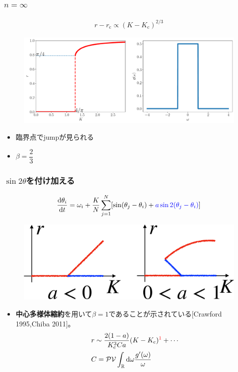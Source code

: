 \begin{frame}\frametitle{$n=\infty$}
  \begin{align*}
    r-r_{\mathrm{c}}\propto(K-K_{\mathrm{c}})^{2/3}
  \end{align*}
  \begin{figure}
    \begin{center}
      \includegraphics[scale=0.3]{figs/bif-n-inf.pdf}
    \end{center}
  \end{figure}
  \begin{itemize}
    \item 臨界点でjumpが見られる
    \item $\beta=\dfrac{2}{3}$
  \end{itemize}
\end{frame}

\begin{frame}\frametitle{$\sin2\theta$を付け加える}
  \begin{align*}
    \frac{\mathrm{d}\theta_{i}}{\mathrm{d} t}=\omega_{i}+\frac{K}{N}\sum_{j=1}^{N}[\sin(\theta_{j}-\theta_{i})+\textcolor{blue}{a\sin2(\theta_{j}-\theta_{i})}]
    \end{align*}
    \begin{figure}
    \includegraphics[scale=0.3]{figs/sin2-crop.pdf}
    \end{figure}
  \begin{itemize}
    \item \textbf{中心多様体縮約}を用いて$\beta=1$であることが示されている[Crawford 1995,Chiba 2011]。
    \begin{align*}
      &r\sim\frac{2(1-a)}{K_{\mathrm{c}}^{3}Ca}(K-K_{\mathrm{c}})^{\textcolor{red}{1}}+\cdots\\
      &C=\mathcal{PV}\int_{\mathbb{R}}\mathrm{d}\omega\frac{g'(\omega)}{\omega}
    \end{align*}
  \end{itemize}
\end{frame}

